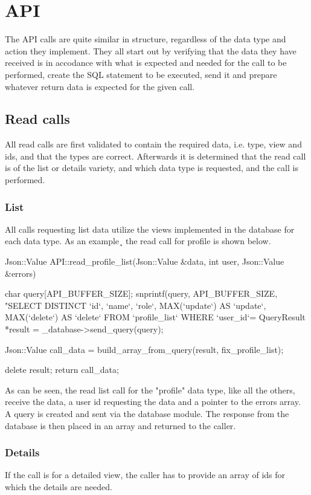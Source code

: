 \section{API}
The API calls are quite similar in structure, regardless of the data type and action they implement. They all start out by verifying that the data they have received is in accodance with what is expected and needed for the call to be performed, create the SQL statement to be executed, send it and prepare whatever return data is expected for the given call. 

\subsection{Read calls}
All read calls are first validated to contain the required data, i.e. type, view and ids, and that the types are correct. Afterwards it is determined that the read call is of the list or details variety, and which data type is requested, and the call is performed.

\subsubsection{List}
All calls requesting list data utilize the views implemented in the database for each data type. As an example¸ the read call for profile is shown below.

\begin{listing}[language=c++, firstline=133]
Json::Value API::read_profile_list(Json::Value &data, int user, Json::Value &errors)
{
	char query[API_BUFFER_SIZE];
	snprintf(query, API_BUFFER_SIZE, "SELECT DISTINCT `id`, `name`, `role`, MAX(`update`) AS `update`, MAX(`delete`) 											AS `delete` FROM `profile_list` WHERE `user_id`=%
	QueryResult *result = _database->send_query(query);

	Json::Value call_data = build_array_from_query(result, fix_profile_list);

	delete result;
	return call_data;
}
\end{listing}

As can be seen, the read list call for the "profile" data type, like all the others, receive the data, a user id requesting the data and a pointer to the errors array. A query is created and sent via the database module. The response from the database is then placed in an array and returned to the caller. 

\subsubsection{Details}
If the call is for a detailed view, the caller has to provide an array of ids for which the details are needed. 

